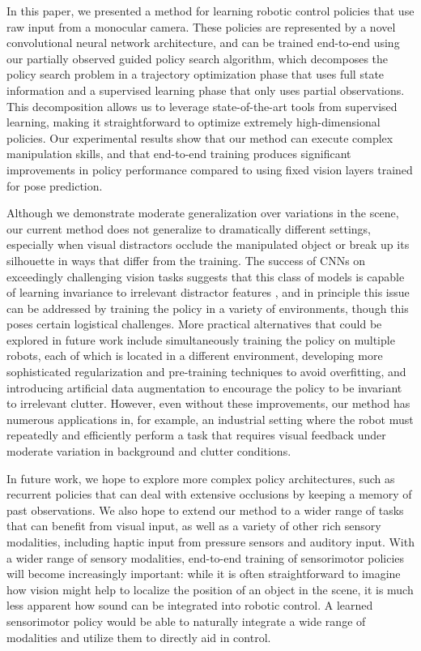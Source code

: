 \documentclass[conference]{IEEEtran}
\begin{document}
In this paper, we presented a method for learning robotic control policies that use raw input from a monocular camera. These policies are represented by a novel convolutional neural network architecture, and can be trained end-to-end using our partially observed guided policy search algorithm, which decomposes the policy search problem in a trajectory optimization phase that uses full state information and a supervised learning phase that only uses partial observations. This decomposition allows us to leverage state-of-the-art tools from supervised learning, making it straightforward to optimize extremely high-dimensional policies. Our experimental results show that our method can execute complex manipulation skills, and that end-to-end training produces significant improvements in policy performance compared to using fixed vision layers trained for pose prediction.

Although we demonstrate moderate generalization over variations in the scene, our current method does not generalize to dramatically different settings, especially when visual distractors occlude the manipulated object or break up its silhouette in ways that differ from the training. The success of CNNs on exceedingly challenging vision tasks suggests that this class of models is capable of learning invariance to irrelevant distractor features \cite{gddm-fhaod-13,ksh-incdc-12,tjlb-jcngm-14}, and in principle this issue can be addressed by training the policy in a variety of environments, though this poses certain logistical challenges. More practical alternatives that could be explored in future work include simultaneously training the policy on multiple robots, each of which is located in a different environment, developing more sophisticated regularization and pre-training techniques to avoid overfitting, and introducing artificial data augmentation to encourage the policy to be invariant to irrelevant clutter. However, even without these improvements, our method has numerous applications in, for example, an industrial setting where the robot must repeatedly and efficiently perform a task that requires visual feedback under moderate variation in background and clutter conditions.

In future work, we hope to explore more complex policy architectures, such as recurrent policies that can deal with extensive occlusions by keeping a memory of past observations. We also hope to extend our method to a wider range of tasks that can benefit from visual input, as well as a variety of other rich sensory modalities, including haptic input from pressure sensors and auditory input. With a wider range of sensory modalities, end-to-end training of sensorimotor policies will become increasingly important: while it is often straightforward to imagine how vision might help to localize the position of an object in the scene, it is much less apparent how sound can be integrated into robotic control. A learned sensorimotor policy would be able to naturally integrate a wide range of modalities and utilize them to directly aid in control.
\end{document}
